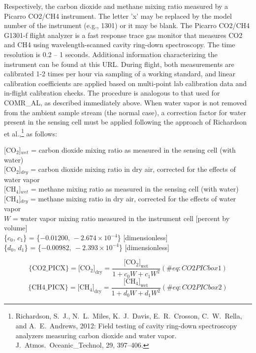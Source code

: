 \documentclass[
  english,
]{book}
\begin{document}
Respectively, the carbon dioxide and methane mixing ratio measured by a
Picarro CO2/CH4 instrument. The letter 'x' may be replaced by the model
number of the instrument (e.g., 1301) or it may be blank. The Picarro
CO2/CH4 G1301-f flight analyzer is a fast response trace gas monitor
that measures CO{2} and CH{4} using wavelength-scanned cavity ring-down
spectroscopy. The time resolution is 0.2 -- 1 seconds. Additional
information characterizing the instrument can be found at this URL.
During flight, both measurements are calibrated 1-2 times per hour via
sampling of a working standard, and linear calibration coefficients are
applied based on multi-point lab calibration data and in-flight
calibration checks. The procedure is analogous to that used for
COMR\_AL, as described immediately above. When water vapor is not
removed from the ambient sample stream (the normal case), a correction
factor for water present in the sensing cell must be applied following
the approach of Richardson et al.,\footnote{Richardson, S.~J.,
  N.~L.~Miles, K.~J.~Davis, E.~R.~Crosson, C.~W.~Rella, and
  A.~E.~Andrews, 2012: Field testing of cavity ring-down spectroscopy
  analyzers measuring carbon dioxide and water vapor.
  J.~Atmos.~Oceanic\_Technol, 29, 397--406.} as follows:

{[}CO\(_{2}\){]}\(_{wet}\) = carbon dioxide mixing ratio as measured in
the sensing cell (with water)\\
{[}CO\(_{2}\){]}\(_{dry}\) = carbon dioxide mixing ratio in dry air,
corrected for the effects of water vapor\\
{[}CH\(_{4}\){]}\(_{wet}\) = methane mixing ratio as measured in the
sensing cell (with water)\\
{[}CH\(_{4}\){]}\(_{dry}\) = methane mixing ratio in dry air, corrected
for the effects of water vapor\\
\(W\) = water vapor mixing ratio measured in the instrument cell
{[}percent by volume{]}\\
\{\(c_{0}\), \(c_{1}\)\} = \{\(-0.01200,\,-2.674\times10^{-4}\)\}
{[}dimensionless{]}\\
\{\(d_{0}\), \(d_{1}\)\} = \{\(-0.00982,\ -2.393\times10^{-4}\)\}
{[}dimensionless{]}

\begin{equation}
\{\mathrm{CO2\_PICX\}}=[\mathrm{CO_{2}]_{dry}=}\frac{[\mathrm{CO_{2}]_{wet}}}{1+c_{0}W+c_{1}W^{2}}
(\#eq:CO2PICbox1)
\end{equation} \begin{equation}
\{\mathrm{CH4\_PICX\}}=[\mathrm{CH_{4}]_{dry}=}\frac{[\mathrm{CH_{4}]_{wet}}}{1+d_{0}W+d_{1}W^{2}}
(\#eq:CO2PICbox2)
\end{equation}
\end{document}
